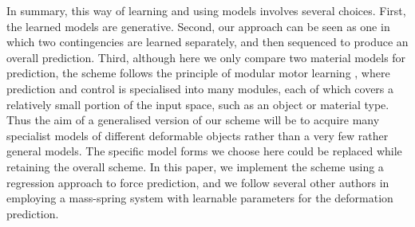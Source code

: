 \documentclass[journal]{IEEEtran}
\begin{document}
In summary, this way of learning and using models involves several choices. First, the learned models are generative. Second, our approach can be seen as one in which two contingencies are learned separately, and then sequenced to produce an overall prediction. Third, although here we only compare two material models for prediction, the scheme follows the principle of modular motor learning \cite{kopickiwyatt16,haruno2001mosaic}, where prediction and control is specialised into many modules, each of which covers a relatively small portion of the input space, such as an object or material type. Thus the aim of a generalised version of our scheme will be to acquire many specialist models of different deformable objects rather than a very few rather general models. The specific model forms we choose here could be replaced while retaining the overall scheme. In this paper, we implement the scheme using a regression approach to force prediction, and we follow several other authors in employing a mass-spring system with learnable parameters for the deformation prediction.

\end{document}
